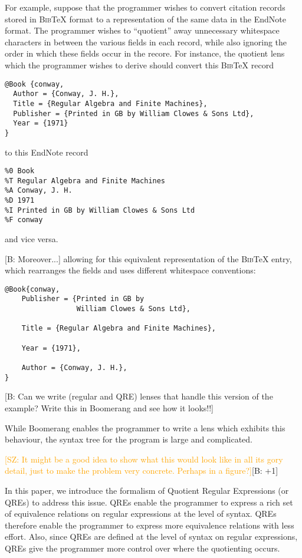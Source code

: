 \documentclass{svproc}
\newcommand{\FINISH}[3]{\ifdraft\textcolor{#1}{[#2: #3]}\fi}
\newcommand{\bcp}[1]{\FINISH{dkred}{B}{#1}}
\newcommand{\saz}[1]{\FINISH{orange}{SZ}{#1}}
\begin{document}
For example, suppose that the programmer wishes to convert citation records
stored in \textsc{Bib}\TeX{} format to a representation of the same data in the
EndNote format. The programmer wishes to ``quotient'' away unnecessary
whitespace characters in between the various fields in each record, while also
ignoring the order in which these fields occur in the recore. For instance, the
quotient lens which the programmer wishes to derive should convert this
\textsc{Bib}\TeX{} record

\begin{verbatim}
@Book {conway,
  Author = {Conway, J. H.},
  Title = {Regular Algebra and Finite Machines},
  Publisher = {Printed in GB by William Clowes & Sons Ltd},
  Year = {1971}
}
\end{verbatim}

\noindent to this EndNote record

\begin{verbatim}
%0 Book
%T Regular Algebra and Finite Machines
%A Conway, J. H.
%D 1971
%I Printed in GB by William Clowes & Sons Ltd
%F conway
\end{verbatim}

\noindent and vice versa.

\bcp{Moreover...}
allowing for this equivalent representation of the \textsc{Bib}\TeX{}
entry, which rearranges the fields and uses different whitespace conventions:

\begin{verbatim}
@Book{conway, 
    Publisher = {Printed in GB by 
                 William Clowes & Sons Ltd},
                 
    Title = {Regular Algebra and Finite Machines},
    
    Year = {1971},
    
    Author = {Conway, J. H.},
}
\end{verbatim}
\bcp{Can we write (regular and QRE) lenses that handle this version of the
  example?  Write this in Boomerang and see how it looks!!} 

While Boomerang enables the programmer to write a lens which exhibits this
behaviour, the syntax tree for the program is large and complicated.  

\saz{It might be a good idea to show what this would look like in all its gory
detail, just to make the problem very concrete. Perhaps in a figure?}\bcp{+1}
  
In this paper, we introduce the formalism of Quotient Regular Expressions (or
QREs) to address this issue. QREs enable the programmer to express
a rich set of equivalence relations on regular expressions at the level of
syntax. QREs therefore enable the programmer to express more equivalence
relations with less effort. Also, since QREs are defined at the level of
syntax on regular expressions, QREs give the programmer more control over where
the quotienting occurs.
\end{document}
